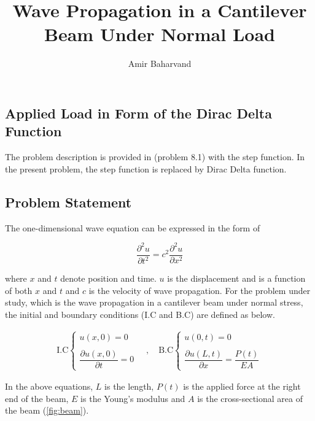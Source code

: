 \documentclass{article}
\title{Wave Propagation in a Cantilever Beam Under Normal Load}
\author{Amir Baharvand }
\date{}
\begin{document}
\maketitle

\subsection{Applied Load in Form of the Dirac Delta Function}

The problem description is provided in \cite{ACHENBACH:1975} (problem 8.1) with the step function. In the present problem, the step function is replaced by Dirac Delta function.

\subsection{Problem Statement}
The one-dimensional wave equation can be expressed in the form of

\begin{equation}
    \dfrac{\partial^2 u}{\partial t^2} = c^2 \dfrac{\partial^2 u}{\partial x^2}
    \label{eq:wave_eqn}
\end{equation}

where $x$ and $t$ denote position and time. $u$ is the displacement and is a function of both $x$ and $t$ and $c$ is the velocity of wave propagation. For the problem under study, which is the wave propagation in a cantilever beam under normal stress, the initial and boundary conditions (I.C and B.C) are defined as below.

\begin{equation*}
\begin{matrix}
    \text{I.C}\begin{cases}
        u(x, 0) = 0 \\ 
        \\
        \dfrac{\partial u(x, 0)}{\partial t} = 0 
    \end{cases} \quad , \quad
    \text{B.C}\begin{cases}
        u(0, t) = 0 \\
        \\
        \dfrac{\partial u(L, t)}{\partial x} = \dfrac{P(t)}{EA}
    \end{cases}
\end{matrix}
\end{equation*}

In the above equations, $L$ is the length, $P(t)$ is the applied force at the right end of the beam, $E$ is the Young's modulus and $A$ is the cross-sectional area of the beam (\cref{fig:beam}).
\end{document}
